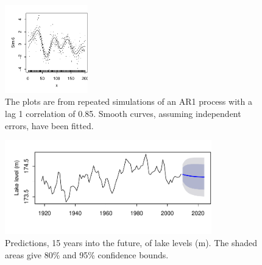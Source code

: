 \documentclass[12pt, a4paper,  BCOR=8.25mm, DIV=15]{scrartcl}\usepackage[]{graphicx}\usepackage[]{color}
\newenvironment{knitrout}{}{} %
\begin{document}
\begin{figure}
\begin{knitrout}
{\includegraphics[width=0.32\textwidth]{figs/xmeth-arima-sim-12_7-6} 

}



\end{knitrout}
\caption{The plots are from repeated simulations of an AR1 process with a
  lag 1 correlation of 0.85.  Smooth curves, assuming independent
  errors, have been fitted.}\label{fig:ar1fits}
\end{figure}

\begin{figure}
\begin{knitrout}
\color{fgcolor}

{\centering \includegraphics[width=0.8\textwidth]{figs/xmeth-Erie-fcast-12_8-1} 

}



\end{knitrout}
\caption{Predictions, 15 years into the future, of lake levels
  (m). The shaded areas give 80\% and 95\% confidence bounds.
}\label{Erie-fcastplot}
\end{figure}
\end{document}

